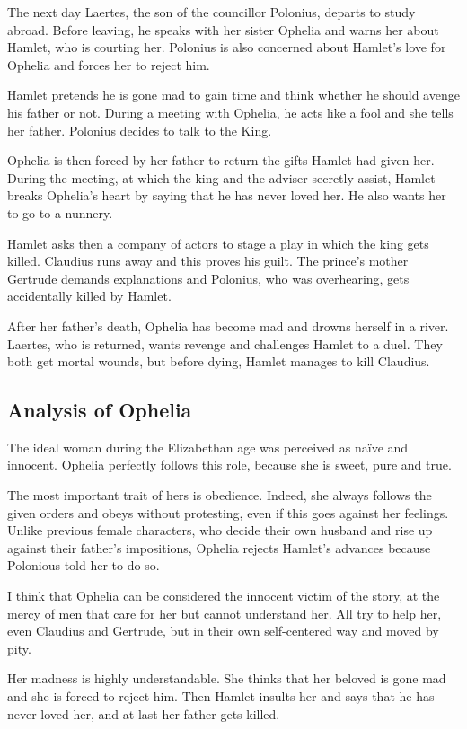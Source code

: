 \documentclass[]{article}
\begin{document}
The next day Laertes, the son of the councillor Polonius, departs to study abroad. Before leaving, he speaks with her sister Ophelia and warns her about Hamlet, who is courting her. Polonius is also concerned about Hamlet's love for Ophelia and forces her to reject him.

Hamlet pretends he is gone mad to gain time and think whether he should avenge his father or not. During a meeting with Ophelia, he acts like a fool and she tells her father. Polonius decides to talk to the King.

Ophelia is then forced by her father to return the gifts Hamlet had given her. During the meeting, at which the king and the adviser secretly assist, Hamlet breaks Ophelia's heart by saying that he has never loved her. He also wants her to go to a nunnery.

Hamlet asks then a company of actors to stage a play in which the king gets killed. Claudius runs away and this proves his guilt. The prince's mother Gertrude demands explanations and Polonius, who was overhearing, gets accidentally killed by Hamlet.

After her father's death, Ophelia has become mad and drowns herself in a river. Laertes, who is returned, wants revenge and challenges Hamlet to a duel. They both get mortal wounds, but before dying, Hamlet manages to kill Claudius.

\subsection*{Analysis of Ophelia}
\hspace{1em}
The ideal woman during the Elizabethan age was perceived as naïve and innocent. Ophelia perfectly follows this role, because she is sweet, pure and true.

The most important trait of hers is obedience. Indeed, she always follows the given orders and obeys without protesting, even if this goes against her feelings. Unlike previous female characters, who decide their own husband and rise up against their father's impositions, Ophelia rejects Hamlet's advances because Polonious told her to do so.

I think that Ophelia can be considered the innocent victim of the story, at the mercy of men that care for her but cannot understand her. All try to help her, even Claudius and Gertrude, but in their own self-centered way and moved by pity.

Her madness is highly understandable. She thinks that her beloved is gone mad and she is forced to reject him. Then Hamlet insults her and says that he has never loved her, and at last her father gets killed.
\end{document}
